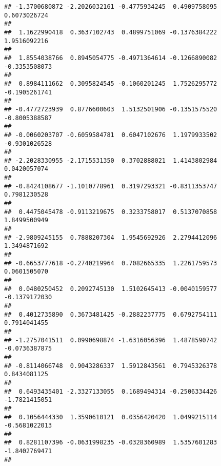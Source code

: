 \documentclass[]{article}
\begin{document}
\begin{verbatim}
## -1.3700680872 -2.2026032161 -0.4775934245  0.4909758095  0.6073026724 
##                                                                       
##  1.1622990418  0.3637102743  0.4899751069 -0.1376384222  1.9516092216 
##                                                                       
##  1.8554038766  0.8945054775 -0.4971364614 -0.1266890082 -0.3353508073 
##                                                                       
##  0.8984111662  0.3095824545 -0.1060201245  1.7526295772 -0.1905261741 
##                                                                       
## -0.4772723939  0.8776600603  1.5132501906 -0.1351575520 -0.8005388587 
##                                                                       
## -0.0060203707 -0.6059584781  0.6047102676  1.1979933502 -0.9301026528 
##                                                                       
## -2.2028330955 -2.1715531350  0.3702888021  1.4143802984  0.0420057074 
##                                                                       
## -0.8424108677 -1.1010778961  0.3197293321 -0.8311353747  0.7981230528 
##                                                                       
##  0.4475045478 -0.9113219675  0.3233758017  0.5137070858  1.8499500949 
##                                                                       
## -2.9809245155  0.7888207304  1.9545692926  2.2794412096  1.3494871692 
##                                                                       
## -0.6653777618 -0.2740219964  0.7082665335  1.2261759573  0.0601505070 
##                                                                       
##  0.0480250452  0.2092745130  1.5102645413 -0.0040159577 -0.1379172030 
##                                                                       
##  0.4012735890  0.3673481425 -0.2882237775  0.6792754111  0.7914041455 
##                                                                       
## -1.2757041511  0.0990698874 -1.6316056396  1.4878590742 -0.0736387875 
##                                                                       
## -0.8114066748  0.9043286337  1.5912843561  0.7945326378  0.8434081125 
##                                                                       
##  0.6493435401 -2.3327133055  0.1689494314 -0.2506334426 -1.7821415051 
##                                                                       
##  0.1056444330  1.3590610121  0.0356420420  1.0499215114 -0.5681022013 
##                                                                       
##  0.8281107396 -0.0631998235 -0.0328360989  1.5357601283 -1.8402769471 
##                                                                       

\end{verbatim}
\end{document}
